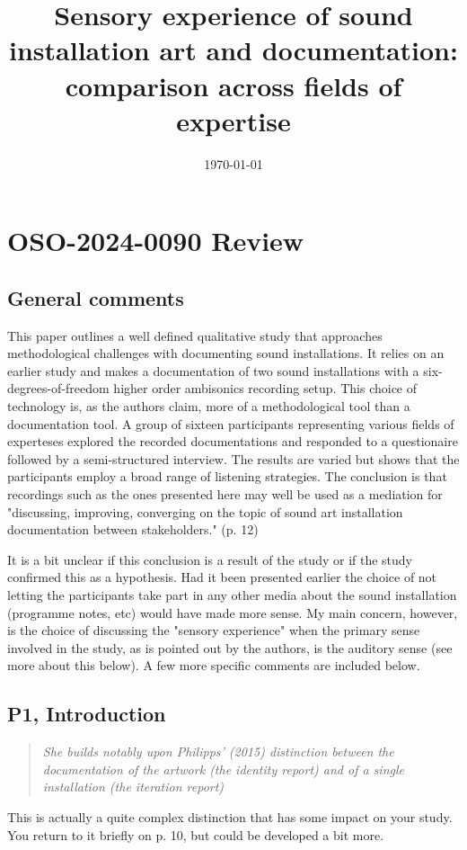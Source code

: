 \documentclass[11pt]{article}
\date{\today}
\title{Sensory experience of sound installation art and documentation: comparison across fields of expertise}
\begin{document}
\maketitle
\renewcommand\familydefault{\sfdefault}
\section*{OSO-2024-0090 Review}
\label{sec:org41067aa}
\subsection*{General comments}
\label{sec:org7d3f02b}
This paper outlines a well defined qualitative study that approaches methodological challenges with documenting sound installations. It relies on an earlier study and makes a documentation of two sound installations with a six-degrees-of-freedom higher order ambisonics recording setup. This choice of technology is, as the authors claim, more of a methodological tool than a documentation tool. A group of sixteen participants representing various fields of experteses explored the recorded documentations and responded to a questionaire followed by a semi-structured interview. The results are varied but shows that the participants employ a broad range of listening strategies. The conclusion is that recordings such as the ones presented here may well be used as a mediation for "discussing, improving, converging on the topic of sound art installation documentation between stakeholders." (p. 12)

It is a bit unclear if this conclusion is a result of the study or if the study confirmed this as a hypothesis. Had it been presented earlier the choice of not letting the participants take part in any other media about the sound installation (programme notes, etc) would have made more sense. My main concern, however, is the choice of discussing the "sensory experience" when the primary sense involved in the study, as is pointed out by the authors, is the auditory sense (see more about this below). A few more specific comments are included below.
\subsection*{P1, Introduction}
\label{sec:org190820f}
\begin{quote}
\emph{She builds notably upon Philipps’ (2015) distinction between the documentation
of the artwork (the identity report) and of a single installation (the iteration report)}
\end{quote}
This is actually a quite complex distinction that has some impact on your study. You return to it briefly on p. 10, but could be developed a bit more.
\end{document}
